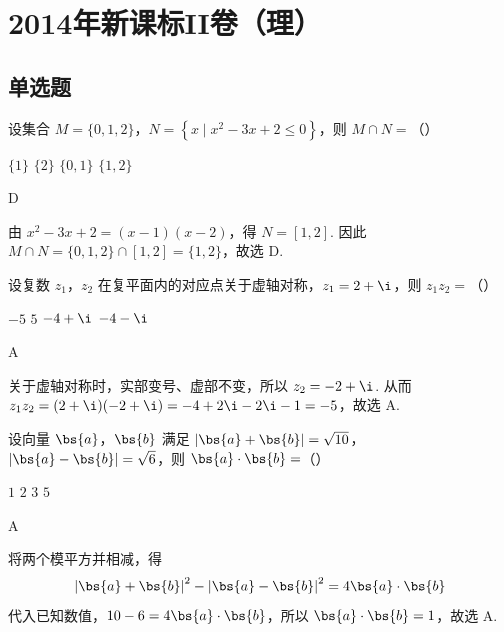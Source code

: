 \chapter{2014年新课标II卷（理）}

\section{单选题}

\begin{problem}
设集合 \(M=\{0,1,2\}\)，\(N=\left\{x\mid x^2-3x+2\leqslant 0\right\}\)，则 \(M\cap N=\)（\quad）

\choices
    {\(\{1\}\)}
    {\(\{2\}\)}
    {\(\{0,1\}\)}
    {\(\{1,2\}\)}
\end{problem}

\begin{answer}
D
\end{answer}

\begin{solution}
由 \(x^2-3x+2=(x-1)(x-2)\)，得 \(N=[1,2]\). 因此
\(M\cap N=\{0,1,2\}\cap[1,2]=\{1,2\}\)，故选 D.
\end{solution}

\begin{problem}
设复数 \(z_1\)，\(z_2\) 在复平面内的对应点关于虚轴对称，\(z_1=2+\i\)，则 \(z_1z_2=\)（\quad）

\choices
    {\(-5\)}
    {\(5\)}
    {\(-4+\i\)}
    {\(-4-\i\)}
\end{problem}

\begin{answer}
A
\end{answer}

\begin{solution}
关于虚轴对称时，实部变号、虚部不变，所以 \(z_2=-2+\i\). 从而
\(z_1z_2=(2+\i)(-2+\i)=-4+2\i-2\i-1=-5\)，故选 A.
\end{solution}

\begin{problem}
设向量 \(\bs{a}\)，\(\bs{b}\) 满足 \(\left|\bs{a}+\bs{b}\right|=\sqrt{10}\)，\(\left|\bs{a}-\bs{b}\right|=\sqrt{6}\)，则 \(\bs{a}\cdot\bs{b}=\)（\quad）

\choices
    {\(1\)}
    {\(2\)}
    {\(3\)}
    {\(5\)}
\end{problem}

\begin{answer}
A
\end{answer}

\begin{solution}
将两个模平方并相减，得
\[
\left|\bs{a}+\bs{b}\right|^2-\left|\bs{a}-\bs{b}\right|^2
 =4\bs{a}\cdot\bs{b}
\]
代入已知数值，\(10-6=4\bs{a}\cdot\bs{b}\)，所以 \(\bs{a}\cdot\bs{b}=1\)，故选 A.
\end{solution}

